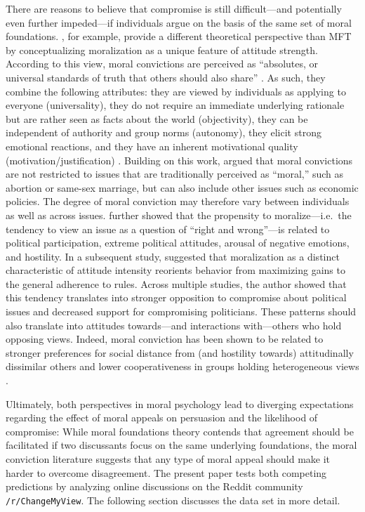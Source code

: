 There are reasons to believe that compromise is still difficult---and potentially even further impeded---if individuals argue on the basis of the same set of moral foundations. \citet{skitka2005moral}, for example, provide a different theoretical perspective than MFT by conceptualizing moralization as a unique feature of attitude strength. According to this view, moral convictions are perceived as ``absolutes, or universal standards of truth that others should also share'' \citep[269]{skitka2010psychology}. As such, they combine the following attributes: they are viewed by individuals as applying to everyone (universality), they do not require an immediate underlying rationale but are rather seen as facts about the world (objectivity), they can be independent of authority and group norms (autonomy), they elicit strong emotional reactions, and they have an inherent motivational quality (motivation/justification) \citep{skitka2010psychology}. Building on this work, \citet{ryan2014reconsidering} argued that moral convictions are not restricted to issues that are traditionally perceived as ``moral,'' such as abortion or same-sex marriage, but can also include other issues such as economic policies. The degree of moral conviction may therefore vary between individuals as well as across issues. \citet{ryan2014reconsidering} further showed that the propensity to moralize---i.e.~the tendency to view an issue as a question of ``right and wrong''---is related to political participation, extreme political attitudes, arousal of negative emotions, and hostility. In a subsequent study, \citet{ryan2016no} suggested that moralization as a distinct characteristic of attitude intensity reorients behavior from maximizing gains to the general adherence to rules. Across multiple studies, the author showed that this tendency translates into stronger opposition to compromise about political issues and decreased support for compromising politicians. These patterns should also translate into attitudes towards---and interactions with---others who hold opposing views. Indeed, moral conviction has been shown to be related to stronger preferences for social distance from (and hostility towards) attitudinally dissimilar others and lower cooperativeness in groups holding heterogeneous views \citep{skitka2005moral}.

Ultimately, both perspectives in moral psychology lead to diverging expectations regarding the effect of moral appeals on persuasion and the likelihood of compromise: While moral foundations theory contends that agreement should be facilitated if two discussants focus on the same underlying foundations, the moral conviction literature suggests that any type of moral appeal should make it harder to overcome disagreement. The present paper tests both competing predictions by analyzing online discussions on the Reddit community \texttt{/r/ChangeMyView}. The following section discusses the data set in more detail. 

